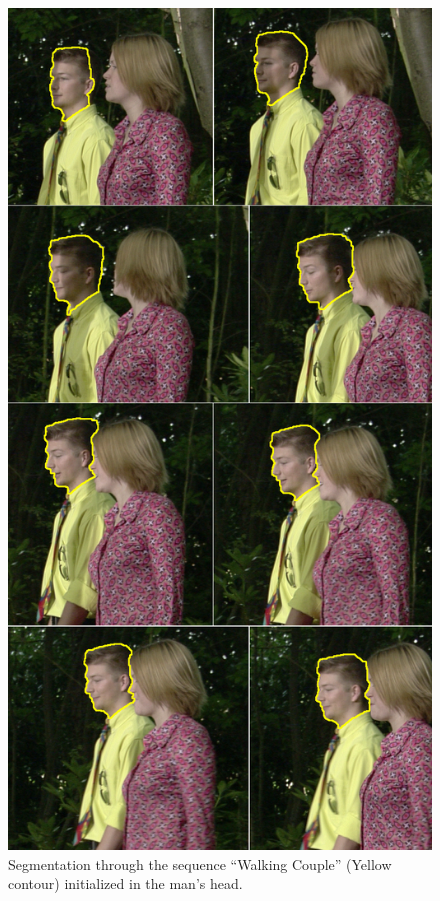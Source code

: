 \documentclass[a4paper, 10pt, conference]{ieeeconf}      %
\begin{document}
   \begin{figure}[thpb]
      \centering
      \includegraphics[height=0.66\textheight]{images/Sequence2.png}
      \caption{Segmentation through the sequence “Walking
	       Couple” (Yellow contour) initialized in the man’s head.}
      \label{figurelabel_walking}
   \end{figure}
\end{document}
